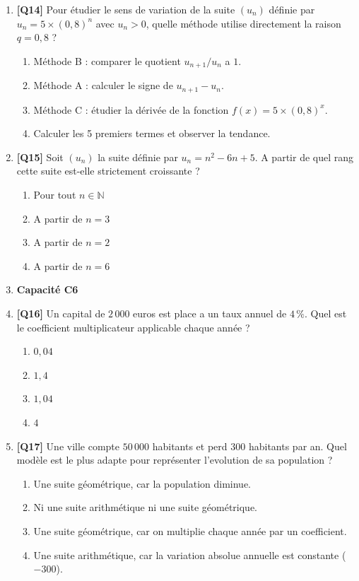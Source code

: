 \begin{enumerate}
\item \textbf{[Q14]} Pour étudier le sens de variation de la suite $(u_n)$ définie par $u_n = 5 \times (0{,}8)^n$ avec $u_n>0$, quelle méthode utilise directement la raison $q=0{,}8$ ?
  \begin{enumerate}[label=\Alph*.]
    \item Méthode B : comparer le quotient $u_{n+1}/u_n$ a $1$.
    \item Méthode A : calculer le signe de $u_{n+1} - u_n$.
    \item Méthode C : étudier la dérivée de la fonction $f(x) = 5 \times (0{,}8)^x$.
    \item Calculer les 5 premiers termes et observer la tendance.
  \end{enumerate}

\item \textbf{[Q15]} Soit $(u_n)$ la suite définie par $u_n = n^2 - 6n + 5$. A partir de quel rang cette suite est-elle strictement croissante ?
  \begin{enumerate}[label=\Alph*.]
    \item Pour tout $n \in \mathbb{N}$
    \item A partir de $n = 3$
    \item A partir de $n = 2$
    \item A partir de $n = 6$
  \end{enumerate}

\item[] \textbf{Capacité C6}

\item \textbf{[Q16]} Un capital de $2\,000$ euros est place a un taux annuel de $4\,\%$. Quel est le coefficient multiplicateur applicable chaque année ?
  \begin{enumerate}[label=\Alph*.]
    \item $0{,}04$
    \item $1{,}4$
    \item $1{,}04$
    \item $4$
  \end{enumerate}

\item \textbf{[Q17]} Une ville compte $50\,000$ habitants et perd $300$ habitants par an. Quel modèle est le plus adapte pour représenter l'evolution de sa population ?
  \begin{enumerate}[label=\Alph*.]
    \item Une suite géométrique, car la population diminue.
    \item Ni une suite arithmétique ni une suite géométrique.
    \item Une suite géométrique, car on multiplie chaque année par un coefficient.
    \item Une suite arithmétique, car la variation absolue annuelle est constante ($-300$).
  \end{enumerate}


\end{enumerate}
